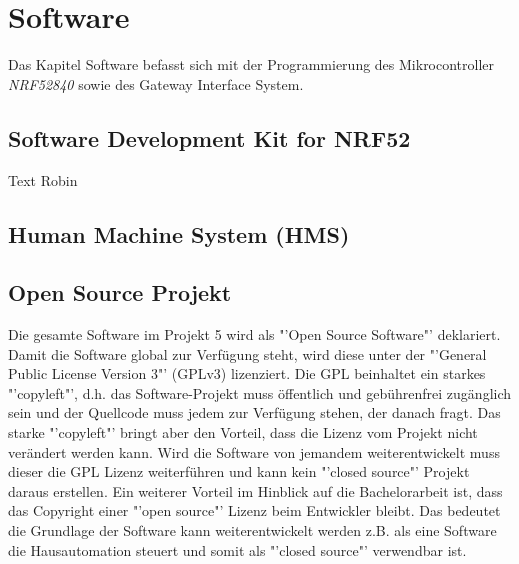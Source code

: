 \clearpage
\section{Software}\label{sec:Software}
Das Kapitel Software befasst sich mit der Programmierung des Mikrocontroller \textit{NRF52840} sowie des Gateway Interface System.

\subsection{Software Development Kit for NRF52}\label{subsec:SDK}
Text Robin

\subsection{Human Machine System (HMS)}\label{subsec:HMS_SW}

\subsection{Open Source Projekt}\label{subsec:OSP}
Die gesamte Software im Projekt 5 wird als "'Open Source Software"' deklariert. Damit die Software global zur Verfügung steht, wird diese unter der "'General Public License Version 3"' (GPLv3) lizenziert. Die GPL beinhaltet ein starkes "'copyleft"', d.h. das Software-Projekt muss öffentlich und gebührenfrei zugänglich sein und der Quellcode muss jedem zur Verfügung stehen, der danach fragt. Das starke "'copyleft"' bringt aber den Vorteil, dass die Lizenz vom Projekt nicht verändert werden kann. Wird die Software von jemandem weiterentwickelt muss dieser die GPL Lizenz weiterführen und kann kein "'closed source"' Projekt daraus erstellen. Ein weiterer Vorteil im Hinblick auf die Bachelorarbeit ist, dass das Copyright einer "'open source"' Lizenz beim Entwickler bleibt. Das bedeutet die Grundlage der Software kann weiterentwickelt werden z.B. als eine Software die Hausautomation steuert und somit als "'closed source"' verwendbar ist. 